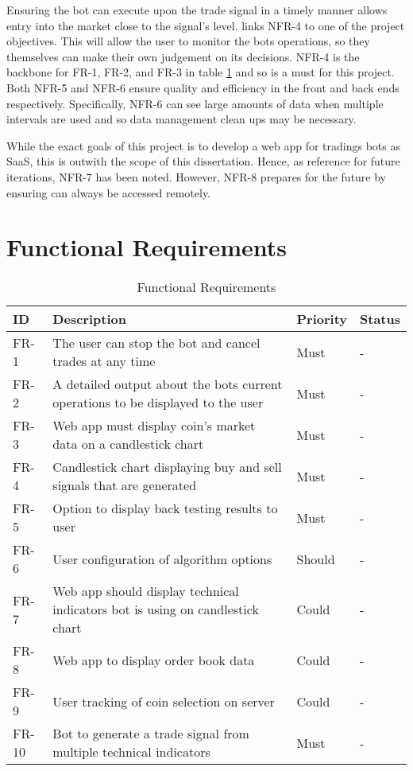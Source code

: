 Ensuring the bot can execute upon the trade signal in a timely manner allows entry into the market close to the signal's level. links NFR-4 to one of the project objectives. This will allow the user to monitor the bots operations, so they themselves can make their own judgement on its decisions. NFR-4 is the backbone for FR-1, FR-2, and FR-3 in table \ref{table:requirements:func} and so is a must for this project. Both NFR-5 and NFR-6 ensure quality and efficiency in the front and back ends respectively. Specifically, NFR-6 can see large amounts of data when multiple intervals are used and so data management clean ups may be necessary.

While the exact goals of this project is to develop a web app for tradings bots as SaaS, this is outwith the scope of this dissertation. Hence, as reference for future iterations, NFR-7 has been noted. However, NFR-8 prepares for the future by ensuring can always be accessed remotely.



\section{Functional Requirements}
\label{sec:requirements:unc}



\begin{table}[htb!]
\centering
\begin{tabular}{|l|p{}|l|l|}
\hline
\textbf{ID} & \textbf{Description} & \textbf{Priority} & \textbf{Status} \\ \hline\hline
FR-1 & The user can stop the bot and cancel trades at any time & Must & - \\ \hline
FR-2 & A detailed output about the bots current operations to be displayed to the user & Must & - \\ \hline
FR-3 & Web app must display coin's market data on a candlestick chart & Must & - \\\hline
FR-4 & Candlestick chart displaying buy and sell signals that are generated & Must & - \\\hline
FR-5 & Option to display back testing results to user & Must & - \\ \hline
FR-6 & User configuration of algorithm options & Should & - \\ \hline
FR-7 & Web app should display technical indicators bot is using on candlestick chart & Could & - \\\hline
FR-8 & Web app to display order book data & Could & - \\\hline
FR-9 & User tracking of coin selection on server & Could & - \\ \hline
FR-10 & Bot to generate a trade signal from multiple technical indicators & Must & - \\ \hline
\end{tabular}
\caption{Functional Requirements}
\label{table:requirements:func}
\end{table}



